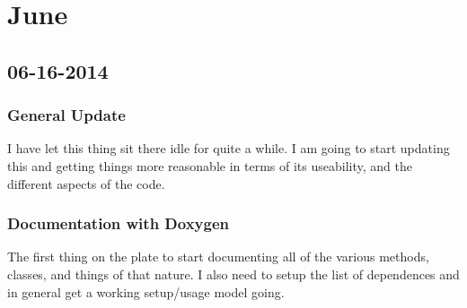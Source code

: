 \chapter{June}
\section{06-16-2014}
\label{sec:06-16-2014}
\subsection{General Update}
I have let this thing sit there idle for quite a while. I am going to start 
updating this and getting things more reasonable in terms of its useability, 
and the different aspects of the code. 

\subsection{Documentation with Doxygen}
The first thing on the plate to start documenting all of the various methods, 
classes, and things of that nature. I also need to setup the list of 
dependences and in general get a working setup/usage model going. 
